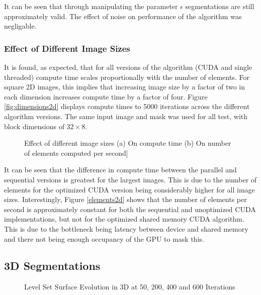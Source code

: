 It can be seen that through manipulating the parameter $\epsilon$ segmentations are still approximately valid. The effect of noise on performance of the algorithm was negligable.

\subsubsection{Effect of Different Image Sizes}\label{dimensions2d}

It is found, as expected, that for all versions of the algorithm (CUDA and single threaded) compute time scales proportionally with the number of elements. For square 2D images, this implies that increasing image size by a factor of two in each dimension increases compute time by a factor of four. Figure \ref{fig:dimensions2d} displays compute times to 5000 iterations across the different algorithm versions. The same input image and mask was used for all test, with block dimensions of $32 \times 8$.

\begin{figure}[p]
	\begin{flushleft}
	\end{flushleft}
	\label{fig:speed}\caption{Effect of different image sizes (a) On compute time (b) On number of elements computed per second]}
\end{figure}

It can be seen that the difference in compute time between the parallel and sequential versions is greatest for the largest images. This is due to the number of elements for the optimized CUDA version being considerably higher for all image sizes. Interestingly, Figure \ref{elements2d} shows that the number of elements per second is approximately constant for both the sequential and unoptimized CUDA implementations, but not for the optimized shared memory CUDA algorithm. This is due to the bottleneck being latency between device and shared memory and there not being enough occupancy of the GPU to mask this.




\subsection{3D Segmentations}

\begin{figure}[h]
  \begin{center}
  \end{center}
  \caption{Level Set Surface Evolution in 3D at 50, 200, 400 and 600 Iterations}
  \label{fig:evolution}
\end{figure}

